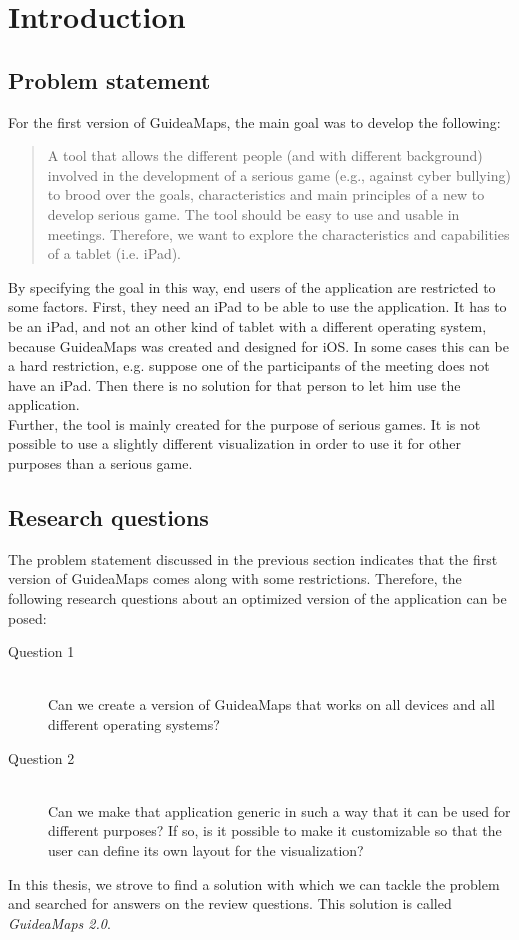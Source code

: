 \chapter{Introduction}\label{ch:introduction}

\section{Problem statement}\label{sec:problem-statement}
For the first version of GuideaMaps, the main goal was to develop the following:

\begin{quote}
A tool that allows the different people (and with different background) involved in the development of a serious game (e.g., against cyber bullying) to brood over the goals, characteristics and main principles of a new to develop serious game. The tool should be easy to use and usable in meetings. Therefore, we want to explore the characteristics and capabilities of a tablet (i.e. iPad). \hfill \citep{erikjanssens}
\end{quote}

By specifying the goal in this way, end users of the application are restricted to some factors. First, they need an iPad to be able to use the application. It has to be an iPad, and not an other kind of tablet with a different operating system, because GuideaMaps was created and designed for iOS. In some cases this can be a hard restriction, e.g. suppose one of the participants of the meeting does not have an iPad. Then there is no solution for that person to let him use the application. \\

Further, the tool is mainly created for the purpose of serious games. It is not possible to use a slightly different visualization in order to use it for other purposes than a serious game.

\section{Research questions}\label{sec:research-questions}
The problem statement discussed in the previous section indicates that the first version of GuideaMaps comes along with some restrictions. Therefore, the following research questions about an optimized version of the application can be posed:

\begin{description}
	\item[Question 1] \hfill \\
	Can we create a version of GuideaMaps that works on all devices and all different operating systems?
	
	\item[Question 2] \hfill \\
	Can we make that application generic in such a way that it can be used for different purposes?
	If so, is it possible to make it customizable so that the user can define its own layout for the visualization?
\end{description}

In this thesis, we strove to find a solution with which we can tackle the problem and searched for answers on the review questions. This solution is called \textit{GuideaMaps 2.0}.


